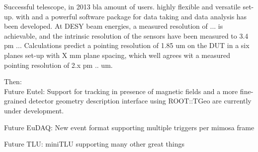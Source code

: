  
Successful telescope, in 2013 bla amount of users.
highly flexible and versatile set-up.
with \eudaq and \EUTelescope a powerful software package for data taking and data analysis has been developed. 
At DESY beam energies, a measured resolution of ... is achievable, and the intrinsic resolution of the \Mimosa sensors have been measured to 3.4 pm ...
Calculations predict a pointing resolution of 1.85 um on the DUT in a six planes set-up with X mm plane spacing, which well agrees wit a measured pointing resolution of 2.x pm .. um.
 
Then:\\ 

Future Eutel:
Support for tracking in presence of magnetic fields and a more fine-grained detector geometry description interface using ROOT::TGeo are currently under development.

Future EuDAQ:
New event format supporting multiple triggers per mimosa frame

Future TLU:
miniTLU supporting many other great things
